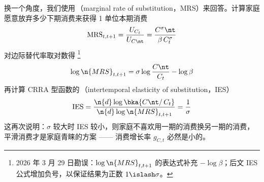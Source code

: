 换一个角度，我们使用\,（marginal rate of substitution，MRS）来回答。计算家庭愿意放弃多少下期消费来获得 1 单位本期消费
\begin{equation*}
    \text{MRS}_{t,t+1}=\dfrac{U_{C_t}}{U_{C\nt}}=\dfrac{C^{\sigma}\nt}{\beta\,C_t^{\sigma}}
\end{equation*}
对边际替代率取对数得 \footnote{2026 年 3 月 29 日勘误：\(\log\n{MRS}_{t,t+1}\) 的表达式补充 \(-\log\beta\)；后文 IES 公式增加负号，以保证结果为正数 \(1\islash\sigma\)。}
\begin{align*}
    \log\n{MRS}_{t,t+1}=\sigma\log\dfrac{C\nt}{C_t}-\log\beta
\end{align*}
再计算 CRRA 型函数的\,（intertemporal elasticity of substitution，IES）
\begin{align*}
    \text{IES}=\dfrac{\n{d}\log\bka{C\nt/\,C_t}}{\n{d}\log\n{MRS}_{t,t+1}}=\dfrac1\sigma
\end{align*}
这再次说明：\(\sigma\) 较大时 IES 较小，则家庭不喜欢用一期的消费换另一期的消费，平滑消费才是家庭青睐的方案 —— 消费增长率 \(g_{C,t}\) 必然是小的。



\SymmetricGeometry

